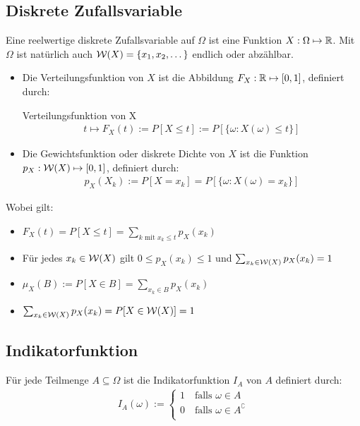 \subsection{Diskrete Zufallsvariable}
Eine reelwertige diskrete Zufallsvariable auf $\Omega$ ist eine Funktion $X :
  \Omega \mapsto \mathbb{R}$. Mit $\Omega$ ist natürlich auch $\mathcal{W} (X) = \{x_1, x_2,
  \dots\}$ endlich oder abzählbar.
\begin{itemize}
  \item Die Verteilungsfunktion von $X$ ist die Abbildung $F_X : \mathbb{R} \mapsto [0, 1]$,
        definiert durch:
        \begin{definition}{Verteilungsfunktion von X}
          \begin{align*}
            t \mapsto F_X (t) := P[X \leq t] := P[\{\omega : X (\omega) \leq t\}]
          \end{align*}
        \end{definition}
  \item Die Gewichtsfunktion oder diskrete Dichte von $X$ ist die Funktion $p_X : \mathcal{W}
          (X) \mapsto [0, 1]$, definiert durch:
        \begin{align*}
          p_X (X_k) := P[X = x_k] = P[\{\omega : X (\omega) = x_k\}]
        \end{align*}
\end{itemize}
Wobei gilt:
\begin{itemize}
  \item $F_X (t) = P[X \leq t] = \sum_{k \text{ mit } x_k \leq t} p_X (x_k)$
  \item Für jedes $x_k \in \mathcal{W} (X)$ gilt $0 \leq p_X (x_k) \leq 1$ und $\sum_{x_k \in \mathcal{W}
            (X)} p_X (x_k) = 1$
  \item $\mu_X (B) := P[X \in B] = \sum_{x_k \in B} p_X (x_k)$
  \item $\sum_{x_k \in \mathcal{W} (X)} p_X (x_k) = P[X \in \mathcal{W} (X)] = 1$
\end{itemize}
\subsection{Indikatorfunktion}
Für jede Teilmenge $A \subseteq \Omega$ ist die Indikatorfunktion $I_A$ von $A$
definiert durch:
\begin{align*}
  I_A (\omega) :=
  \begin{cases}
    1 \quad \text{falls } \omega \in A             \\
    0 \quad \text{falls } \omega \in A^\complement \\
  \end{cases}
\end{align*}
